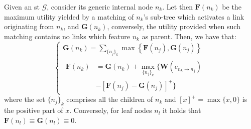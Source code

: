 \begin{lem}
\label{lemma_utils}
Given an \gls{st} $\mathcal{G}$, consider its generic internal node $n_k$. Let then $\mathbf{F}(n_k)$ be the maximum utility yielded by a matching of $n_k$'s sub-tree which activates a link originating from $n_k$, and $\mathbf{G}(n_k)$, conversely, the utility provided when such matching contains no links which feature $n_k$ as parent. Then, we have that:
\[ 
\begin{cases}
\mathbf{G}(n_k) = \sum\limits_{ \{ n_j \}_k} \max \left\{ \mathbf{F}(n_j), \mathbf{G}(n_j) \right\} \\

\begin{aligned}
\mathbf{F}(n_k) &= \mathbf{G}(n_k) + \underset{\{ n_j \}_k }{\max} \{ \mathbf{W} ( e_{n_k \to n_j} ) \\
&- \left[ \mathbf{F}(n_j) - \mathbf{G}(n_j) \right]^+ \}
\end{aligned}


\end{cases}
\]
where the set $\{ n_j \}_k$ comprises all the children of $n_k$ and $\left[ x \right]^+ = \max\{x, 0\}$ is the positive part of $x$.
%
Conversely, for leaf nodes $n_l$ it holds that $\mathbf{F}(n_l) \equiv \mathbf{G}(n_l) \equiv 0 $.
\end{lem}

